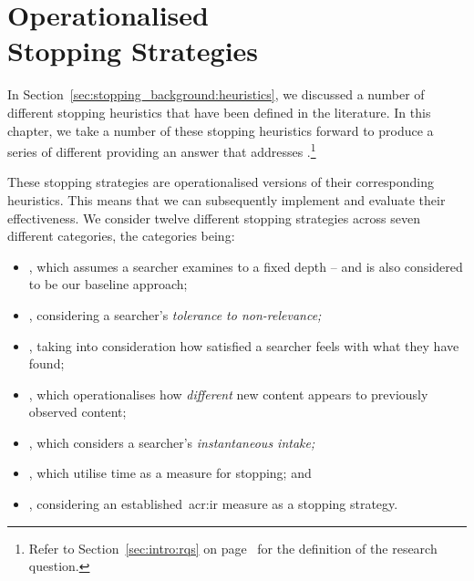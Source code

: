 
\chapter[Operationalised Stopping Strategies]{Operationalised\\Stopping Strategies}\label{chap:strategies}
In Section~\ref{sec:stopping_background:heuristics}, we discussed a number of different stopping heuristics that have been defined in the literature. In this chapter, we take a number of these stopping heuristics forward to produce a series of different  providing an answer that addresses .\footnote{Refer to Section~\ref{sec:intro:rqs} on page~\pageref{sec:intro:rqs} for the definition of the research question.}

\begin{figure}[h]
    \centering
    \vspace{4mm}
    \label{fig:conversion}
    \vspace{-5mm}
\end{figure}

These stopping strategies are operationalised versions of their corresponding heuristics. This means that we can subsequently implement and evaluate their effectiveness. We consider twelve different stopping strategies across seven different categories, the categories being:

\begin{itemize}
    \item{, which assumes a searcher examines to a fixed depth -- and is also considered to be our baseline approach;}
    \item{, considering a searcher's \emph{tolerance to non-relevance;}}
    \item{, taking into consideration how satisfied a searcher feels with what they have found;}
    \item{, which operationalises how \emph{different} new content appears to previously observed content;}
    \item{, which considers a searcher's \emph{instantaneous intake;}}
    \item{, which utilise time as a measure for stopping; and}
    \item{, considering an established~\gls{acr:ir} measure as a stopping strategy.}
\end{itemize}

